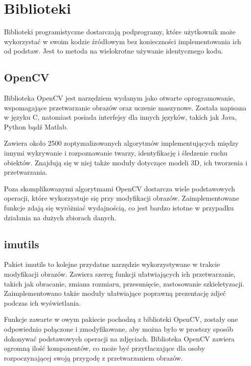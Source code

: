 
\section{Biblioteki}
Biblioteki programistyczne dostarczają podprogramy, które użytkownik może wykorzystać w swoim kodzie źródłowym bez konieczności implementowania ich od podstaw. Jest to metoda na wielokrotne używanie identycznego kodu.


\subsection{OpenCV}
Biblioteka OpenCV \cite{opencv} jest narzędziem wydanym jako otwarte oprogramowanie, wspomagające przetwarzanie obrazów oraz uczenie maszynowe. Została napisana w języku C, natomiast posiada interfejsy dla innych języków, takich jak Java, Python bądź Matlab.

Zawiera około 2500 zoptymalizowanych algorytmów implementujących między innymi wykrywanie i rozpoznawanie twarzy, identyfikację i śledzenie ruchu obiektów. Znajdują się w niej także moduły dotyczące modeli 3D, ich tworzenia i przetwarzania.

Poza skomplikowanymi algorytmami OpenCV dostarcza wiele podstawowych operacji, które wykorzystuje się przy modyfikacji obrazów. Zaimplementowane funkcje zdają się wyróżniać wydajnością, co jest bardzo istotne w przypadku działania na dużych zbiorach danych.


\subsection{imutils}
Pakiet imutils \cite{imutils} to kolejne przydatne narzędzie wykorzystywane w trakcie modyfikacji obrazów. Zawiera szereg funkcji ułatwiających ich przetwarzanie, takich jak obracanie, zmiana rozmiaru, przesunięcie, zastosowanie szkieletyzacji. Zaimplementowano także moduły ułatwiające poprawną prezentację zdjeć podczas ich wyświetlania.

Funkcje zawarte w owym pakiecie pochodzą z biblioteki OpenCV, zostały one odpowiednio połączone i zmodyfikowane, aby można było w prostszy sposób dokonywać podstawowych operacji na zdjęciach. Biblioteka OpenCV zawiera ogromną ilość komponentów, co może być przytłaczające dla osoby rozpoczynającej swoją przygodę z przetwarzaniem obrazów.

